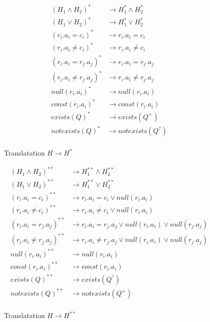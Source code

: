 \begin{figure}[H]
	\caption{\label{h*2} Translatation $H \rightarrow H^*$ }
	\begin{mdframed}
		\fontsize{8}{6}
\begin{align*}
	(H_1 \land H_2)^* & \rightarrow H_1^* \land H_2^* \\
	(H_1 \lor H_2)^* & \rightarrow H_1^* \lor H_2^* \\
	(r_i.a_i = c_i)^* & \rightarrow r_i.a_i = c_i \\
	(r_i.a_i \neq c_i)^*& \rightarrow r_i.a_i \neq c_i \\
	(r_i.a_i = r_j.a_j)^* & \rightarrow r_i.a_i = r_j.a_j \\
	(r_i.a_i \neq r_j.a_j)^* & \rightarrow r_i.a_i \neq r_j.a_j \\
	null(r_i.a_i)^* & \rightarrow null(r_i.a_i) \\
	const(r_i.a_i)^* & \rightarrow const(r_i.a_i) \\
	exists(Q)^* & \rightarrow exists(Q^+) \\
	notexists(Q)^* & \rightarrow notexists(Q^?) \\
\end{align*}
\end{mdframed}
\end{figure}

\begin{figure}[H]
	\caption{\label{h**2} Translatation $H \rightarrow H^{**}$ }
	\begin{mdframed}
		\fontsize{8}{6}
\begin{align*}
	(H_1 \land H_2)^{**} & \rightarrow H_1^{**} \land H_2^{**} \\
	(H_1 \lor H_2)^{**} & \rightarrow H_1^{**} \lor H_2^{**} \\
	(r_i.a_i = c_i)^{**} & \rightarrow r_i.a_i = c_i \lor null(r_i.a_i)\\
	(r_i.a_i \neq c_i)^{**}& \rightarrow r_i.a_i \neq c_i \lor null(r_i.a_i)\\
	(r_i.a_i = r_j.a_j)^{**} & \rightarrow r_i.a_i = r_j.a_j \lor null(r_i.a_i) \lor null(r_j.a_j)\\
	(r_i.a_i \neq r_j.a_j)^{**} & \rightarrow r_i.a_i \neq r_j.a_j  \lor null(r_i.a_i) \lor null(r_j.a_j)\\
	null(r_i.a_i)^{**} & \rightarrow null(r_i.a_i) \\
	const(r_i.a_i)^{**} & \rightarrow const(r_i.a_i) \\
	exists(Q)^{**} & \rightarrow exists(Q^?) \\
	notexists(Q)^{**} & \rightarrow notexists(Q^+) \\
\end{align*}
\end{mdframed}
\end{figure}

